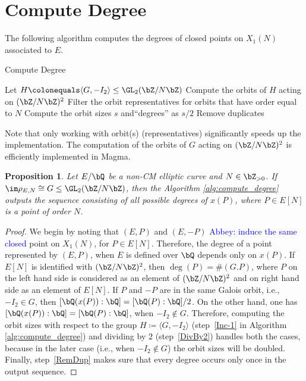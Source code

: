 \documentclass[11pt,reqno]{amsart}
\theoremstyle{plain}
\newtheorem{proposition}[theorem]{Proposition}
\theoremstyle{definition}
\newcommand{\Q}{\bQ}
\newcommand{\Z}{\bZ}
\newcommand{\abbey}[1]{\textcolor{blue}{Abbey: #1}}
\begin{document}
\section{Compute Degree}

The following algorithm computes the degrees of closed points on $X_1(N)$ associated to $E$.


\begin{algorithm}[H] \caption{Compute Degree}\label{alg:compute_degree}
  \KwIn{$G\subseteq \GL_2(\Z/N\Z)$ such that $\im\rho_E=\pi^{-1}(G)$ and $N$ is the level}
  Let $H \colonequals \langle G, -I_2\rangle \leq \GL_2(\Z/N\Z)$\;
  Compute the orbits of $H$ acting on $(\Z/N\Z)^2$\label{Inc-1}\;
  Filter the orbit representatives for orbits that have order equal to $N$\;
  Compute the orbit sizes $s$ and``degrees'' as $s/2$ \label{DivBy2}\;
  Remove duplicates\label{RemDup}\;
\end{algorithm}

Note that only working with orbit(s) (representatives) significantly speeds up the implementation. The computation of the orbits of $G$ acting on $(\Z/N\Z)^2$ is efficiently implemented in Magma.

\begin{proposition}
Let $E/\Q$ be a non-CM elliptic curve and $N \in \Z_{>0}$. If $\im \rho_{E,N} \cong G \leq \GL_2(\Z/N\Z)$, then the Algorithm \ref{alg:compute_degree} outputs the sequence consisting of all possible degrees of $x(P)$, where $P\in E[N]$ is a point of order $N$.
\end{proposition}
\begin{proof}
    We begin by noting that $(E, P)$ and $(E, -P)$ \abbey{induce the same closed} point on $X_1(N)$, for $P \in E[N]$. Therefore, the degree of
    a point represented by $(E, P)$, when
    $E$ is defined over $\Q$ depends only on $x(P)$.
    If $E[N]$ is identified with $(\Z/N\Z)^2$, then $\deg(P)=\# (G. P)$, where $P$ on the left hand side is considered as an element of $(\Z/N\Z)^2$
    and on right hand side as an element of $E[N]$.
    If $P$ and $-P$ are in the same Galois orbit, i.e., $-I_2\in G$, then $[\Q(x(P)):\Q]=[\Q(P):\Q]/2$. On the other hand, one has $[\Q(x(P)):\Q]=[\Q(P):\Q]$, when
    $-I_2\notin G$.
    Therefore, computing the orbit sizes with respect to the
    group $H\coloneqq \langle G, -I_2 \rangle$ (step~\ref{Inc-1} in Algorithm \ref{alg:compute_degree}) and dividing
    by $2$ (step~\ref{DivBy2}) handles both the cases, because in the later case (i.e., when $-I_2\notin G$) the orbit sizes will be doubled.
    Finally, step~\ref{RemDup} makes sure that every degree occurs only once in the output sequence.
\end{proof}
\end{document}
